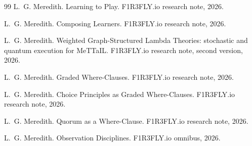 \documentclass[11pt]{article}
\theoremstyle{plain}
\theoremstyle{definition}
\theoremstyle{remark}
\begin{document}
\begin{thebibliography}{99}
 L.~G. Meredith.
  Learning to Play. F1R3FLY.io research note, 2026.

 L.~G. Meredith.
  Composing Learners. F1R3FLY.io research note, 2026.

 L.~G. Meredith.
  Weighted Graph-Structured Lambda Theories: stochastic and quantum execution
  for MeTTaIL. F1R3FLY.io research note, second version, 2026.

 L.~G. Meredith.
  Graded Where-Clauses. F1R3FLY.io research note, 2026.

 L.~G. Meredith.
  Choice Principles as Graded Where-Clauses. F1R3FLY.io research note, 2026.

 L.~G. Meredith.
  Quorum as a Where-Clause. F1R3FLY.io research note, 2026.

 L.~G. Meredith.
  Observation Disciplines. F1R3FLY.io omnibus, 2026.

\end{thebibliography}
\end{document}

